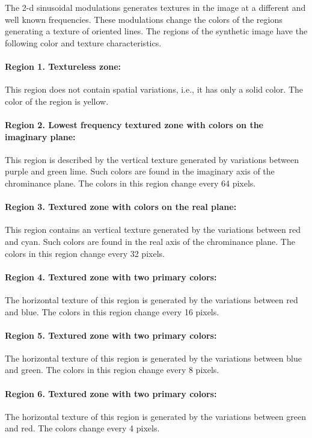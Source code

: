 The 2-d sinusoidal modulations generates textures in the image at a different and well known frequencies. These modulations change the colors of the regions generating a texture of oriented lines. The regions of the synthetic image have the following color and texture characteristics.

\paragraph{Region 1. Textureless zone:}
This region does not contain spatial variations, i.e., it has only a solid color. The color of the region is yellow.

\paragraph{Region 2. Lowest frequency textured zone with colors on the imaginary plane:}
This region is described by the vertical texture generated by variations between purple and green lime. Such colors are found in the imaginary axis of the chrominance plane. The colors in this region change every 64 pixels.

\paragraph{Region 3. Textured zone with colors on the real plane:}
This region contains an vertical texture generated by the variations between red and cyan. Such colors are found in the real axis of the chrominance plane. The colors in this region change every 32 pixels.

\paragraph{Region 4. Textured zone with two primary colors:}
The horizontal texture of this region is generated by the variations between red and blue. The colors in this region change every 16 pixels. 

\paragraph{Region 5. Textured zone with two primary colors:}
The horizontal texture of this region is generated by the variations between blue and green. The colors in this region change every 8 pixels. 

\paragraph{Region 6. Textured zone with two primary colors:}
The horizontal texture of this region is generated by the variations between green and red. The colors change every 4 pixels.

